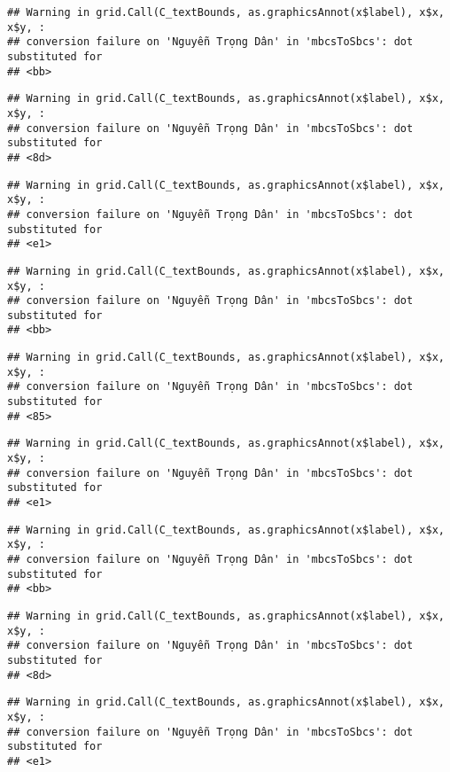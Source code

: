 \documentclass[
]{article}
\begin{document}
\begin{verbatim}
## Warning in grid.Call(C_textBounds, as.graphicsAnnot(x$label), x$x, x$y, :
## conversion failure on 'Nguyễn Trọng Dân' in 'mbcsToSbcs': dot substituted for
## <bb>
\end{verbatim}

\begin{verbatim}
## Warning in grid.Call(C_textBounds, as.graphicsAnnot(x$label), x$x, x$y, :
## conversion failure on 'Nguyễn Trọng Dân' in 'mbcsToSbcs': dot substituted for
## <8d>
\end{verbatim}

\begin{verbatim}
## Warning in grid.Call(C_textBounds, as.graphicsAnnot(x$label), x$x, x$y, :
## conversion failure on 'Nguyễn Trọng Dân' in 'mbcsToSbcs': dot substituted for
## <e1>
\end{verbatim}

\begin{verbatim}
## Warning in grid.Call(C_textBounds, as.graphicsAnnot(x$label), x$x, x$y, :
## conversion failure on 'Nguyễn Trọng Dân' in 'mbcsToSbcs': dot substituted for
## <bb>
\end{verbatim}

\begin{verbatim}
## Warning in grid.Call(C_textBounds, as.graphicsAnnot(x$label), x$x, x$y, :
## conversion failure on 'Nguyễn Trọng Dân' in 'mbcsToSbcs': dot substituted for
## <85>
\end{verbatim}

\begin{verbatim}
## Warning in grid.Call(C_textBounds, as.graphicsAnnot(x$label), x$x, x$y, :
## conversion failure on 'Nguyễn Trọng Dân' in 'mbcsToSbcs': dot substituted for
## <e1>
\end{verbatim}

\begin{verbatim}
## Warning in grid.Call(C_textBounds, as.graphicsAnnot(x$label), x$x, x$y, :
## conversion failure on 'Nguyễn Trọng Dân' in 'mbcsToSbcs': dot substituted for
## <bb>
\end{verbatim}

\begin{verbatim}
## Warning in grid.Call(C_textBounds, as.graphicsAnnot(x$label), x$x, x$y, :
## conversion failure on 'Nguyễn Trọng Dân' in 'mbcsToSbcs': dot substituted for
## <8d>
\end{verbatim}

\begin{verbatim}
## Warning in grid.Call(C_textBounds, as.graphicsAnnot(x$label), x$x, x$y, :
## conversion failure on 'Nguyễn Trọng Dân' in 'mbcsToSbcs': dot substituted for
## <e1>
\end{verbatim}
\end{document}
